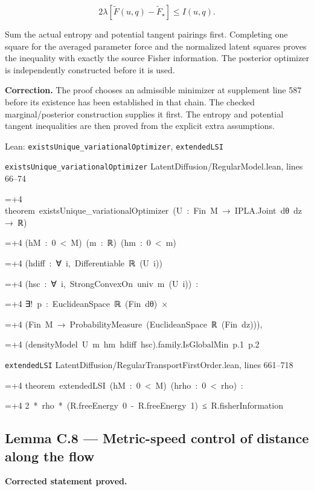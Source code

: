 \documentclass[11pt,a4paper]{report}
\newlength{\leancharwidth}
\newenvironment{leancode}{\par\smallskip\begingroup\ttfamily\footnotesize\raggedright
  \settowidth{\leancharwidth}{M}\setlength{\parskip}{0pt}\setlength{\parindent}{0pt}
  \frenchspacing}{\par\endgroup\smallskip}
\newcommand{\leanline}[2]{\hangindent=\dimexpr#1\leancharwidth+4\leancharwidth\relax
  \hangafter=1\noindent\hspace*{#1\leancharwidth}#2\par}
\newcommand{\leansource}[1]{\par{\footnotesize\color{leanmuted}#1}\par}
\begin{document}
 \[2\lambda[\widetilde F(u,q)-\widetilde F_\star]\le I(u,q).\]


Sum the actual entropy and potential tangent pairings first. Completing one square for the averaged parameter force and the normalized latent squares proves the inequality with exactly the source Fisher information. The posterior optimizer is independently constructed before it is used.



\textbf{Correction.} The proof chooses an admissible minimizer at supplement line 587 before its existence has been established in that chain. The checked marginal/\allowbreak{}posterior construction supplies it first. The entropy and potential tangent inequalities are then proved from the explicit extra assumptions.

\begin{leanbox}{Lean: \texttt{existsUnique\_\allowbreak{}variationalOptimizer}, \texttt{extendedLSI}}
\leansource{\texttt{existsUnique\_\allowbreak{}variationalOptimizer} \quad LatentDiffusion/\allowbreak{}RegularModel.lean, lines 66–74}
\begin{leancode}
\leanline{0}{theorem\ existsUnique\_variationalOptimizer\ (U\ :\ Fin\ M\ →\ IPLA.Joint\ dθ\ dz\ →\ ℝ)}
\leanline{4}{(hM\ :\ 0\ <\ M)\ (m\ :\ ℝ)\ (hm\ :\ 0\ <\ m)}
\leanline{4}{(hdiff\ :\ ∀\ i,\ Differentiable\ ℝ\ (U\ i))}
\leanline{4}{(hsc\ :\ ∀\ i,\ StrongConvexOn\ univ\ m\ (U\ i))\ :}
\leanline{4}{∃!\ p\ :\ EuclideanSpace\ ℝ\ (Fin\ dθ)\ ×}
\leanline{8}{(Fin\ M\ →\ ProbabilityMeasure\ (EuclideanSpace\ ℝ\ (Fin\ dz))),}
\leanline{6}{(densityModel\ U\ m\ hm\ hdiff\ hsc).family.IsGlobalMin\ p.1\ p.2}
\end{leancode}
\leansource{\texttt{extendedLSI} \quad LatentDiffusion/\allowbreak{}RegularTransportFirstOrder.lean, lines 661–718}
\begin{leancode}
\leanline{0}{theorem\ extendedLSI\ (hM\ :\ 0\ <\ M)\ (hrho\ :\ 0\ <\ rho)\ :}
\leanline{4}{2\ *\ rho\ *\ (R.freeEnergy\ 0\ -\ R.freeEnergy\ 1)\ ≤\ R.fisherInformation}
\end{leancode}
\end{leanbox}
\subsection{\texorpdfstring{Lemma C.8 — Metric-speed control of distance along the flow}{Lemma C.8 — Metric-speed control of distance along the flow}}


\textbf{Corrected statement proved.}
\end{document}
